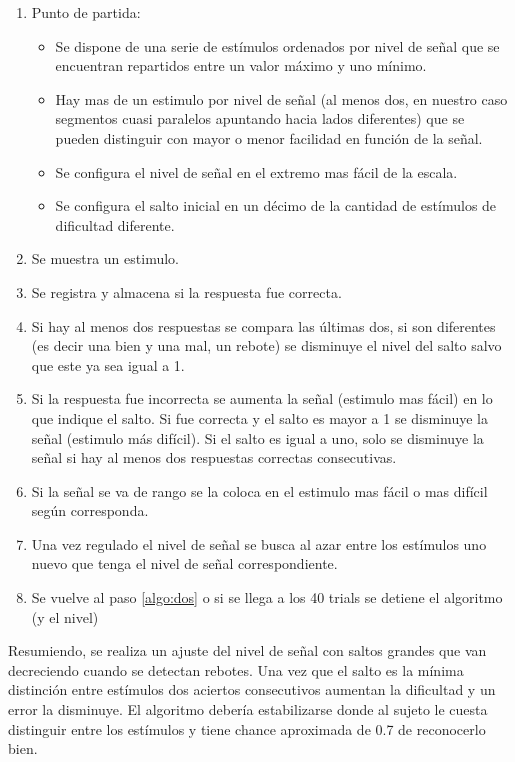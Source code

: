 \documentclass{article}
\begin{document}
    \begin{enumerate}
        \item Punto de partida:
        \begin{itemize}
            \item Se dispone de una serie de estímulos ordenados por nivel de señal que se encuentran repartidos entre un valor máximo y uno mínimo. 
            \item Hay mas de un estimulo por nivel de señal (al menos dos, en nuestro caso segmentos cuasi paralelos apuntando hacia lados diferentes) que se pueden distinguir con mayor o menor facilidad en función de la señal. 
            \item Se configura el nivel de señal en el extremo mas fácil de la escala. 
            \item Se configura el salto inicial en un décimo de la cantidad de estímulos de dificultad diferente.
        \end{itemize}
        \item Se muestra un estimulo. \label{algo:dos}
        \item Se registra y almacena si la respuesta fue correcta.
        \item Si hay al menos dos respuestas se compara las últimas dos, si son diferentes (es decir una bien y una mal, un rebote) se disminuye el nivel del salto salvo que este ya sea igual a 1.
        \item Si la respuesta fue incorrecta se aumenta la señal (estimulo mas fácil) en lo que indique el salto. Si fue correcta y el salto es mayor a 1 se disminuye la señal (estimulo más difícil). Si el salto es igual a uno, solo se disminuye la señal si hay al menos dos respuestas correctas consecutivas.  
        \item Si la señal se va de rango se la coloca en el estimulo mas fácil o mas difícil según corresponda. 
        \item Una vez regulado el nivel de señal se busca al azar entre los estímulos uno nuevo que tenga el nivel de señal correspondiente. 
        \item Se vuelve al paso \ref{algo:dos} o si se llega a los 40 trials se detiene el algoritmo (y el nivel)
    \end{enumerate}
    
    Resumiendo, se realiza un ajuste del nivel de señal con saltos grandes que van decreciendo cuando se detectan rebotes. Una vez que el salto es la mínima distinción entre estímulos dos aciertos consecutivos aumentan la dificultad y un error la disminuye. El algoritmo debería estabilizarse donde al sujeto le cuesta distinguir entre los estímulos y tiene chance aproximada de 0.7 de reconocerlo bien. 
    
\end{document}
